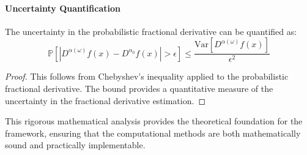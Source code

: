 \paragraph{Uncertainty Quantification}

\begin{theorem}
The uncertainty in the probabilistic fractional derivative can be quantified as:
\begin{equation}
\mathbb{P}[|D^{\alpha(\omega)} f(x) - D^{\alpha_0} f(x)| > \epsilon] \leq \frac{\text{Var}[D^{\alpha(\omega)} f(x)]}{\epsilon^2}
\end{equation}
\end{theorem}

\begin{proof}
This follows from Chebyshev's inequality applied to the probabilistic fractional derivative. The bound provides a quantitative measure of the uncertainty in the fractional derivative estimation.
\end{proof}

This rigorous mathematical analysis provides the theoretical foundation for the \hpfracc framework, ensuring that the computational methods are both mathematically sound and practically implementable.
